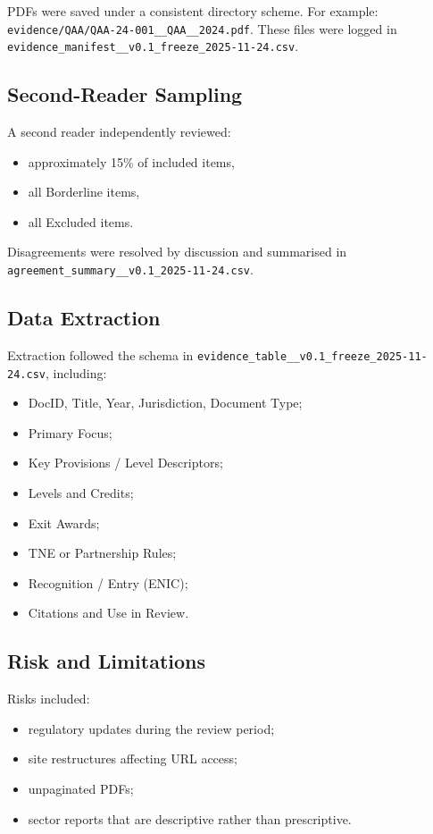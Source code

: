 \raggedright
PDFs were saved under a consistent directory scheme. For example: \texttt{evidence/QAA/QAA-24-001\_\_QAA\_\_2024.pdf}. These files were logged in \texttt{evidence\_manifest\_\_v0.1\_freeze\_2025-11-24.csv}.


\subsection{Second-Reader Sampling}

A second reader independently reviewed:

\begin{itemize}
    \item approximately 15\% of included items,
    \item all Borderline items,
    \item all Excluded items.
\end{itemize}

Disagreements were resolved by discussion and summarised in
\texttt{agreement\_summary\_\_v0.1\_2025-11-24.csv}.

\subsection{Data Extraction}

Extraction followed the schema in \texttt{evidence\_table\_\_v0.1\_freeze\_2025-11-24.csv}, including:

\begin{itemize}
    \item DocID, Title, Year, Jurisdiction, Document Type;
    \item Primary Focus;
    \item Key Provisions / Level Descriptors;
    \item Levels and Credits;
    \item Exit Awards;
    \item TNE or Partnership Rules;
    \item Recognition / Entry (ENIC);
    \item Citations and Use in Review.
\end{itemize}

\subsection{Risk and Limitations}

Risks included:

\begin{itemize}
    \item regulatory updates during the review period;
    \item site restructures affecting URL access;
    \item unpaginated PDFs;
    \item sector reports that are descriptive rather than prescriptive.
\end{itemize}

